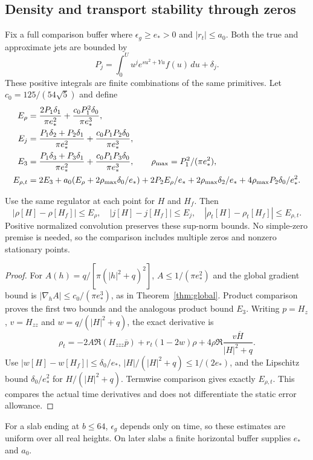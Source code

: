 

\subsection{Density and transport stability through zeros}
Fix a full comparison buffer where $\epsilon_g\ge e_*>0$ and
$|r_t|\le a_0$. Both the true and approximate jets are bounded by
\begin{equation}
 P_j=\int_0^U u^je^{su^2+Yu}f(u)\,du+\delta_j.
 \label{eq:finitejetmajorants}
\end{equation}
These positive integrals are finite combinations of the same primitives.
Let $c_0=125/(54\sqrt5)$ and define
\begin{align}
 E_\rho&=\frac{2P_1\delta_1}{\pi e_*^2}
                   +\frac{c_0P_1^2\delta_0}{\pi e_*^3},\notag\\
 E_j&=\frac{P_1\delta_2+P_2\delta_1}{\pi e_*^2}
                   +\frac{c_0P_1P_2\delta_0}{\pi e_*^3},\notag\\
 E_3&=\frac{P_1\delta_3+P_3\delta_1}{\pi e_*^2}
                   +\frac{c_0P_1P_3\delta_0}{\pi e_*^3},\qquad
 \rho_{\max}=P_1^2/(\pi e_*^2),\label{eq:fieldstability}\\
 E_{\rho,t}&=2E_3+a_0(E_\rho+2\rho_{\max}\delta_0/e_*)
       +2P_2E_\rho/e_*+2\rho_{\max}\delta_2/e_*
       +4\rho_{\max}P_2\delta_0/e_*^2.\notag
\end{align}

\begin{proposition}\label{prop:fieldstability}
Use the same regulator at each point for $H$ and $H_f$. Then
\begin{equation}
 |\rho[H]-\rho[H_f]|\le E_\rho,\quad
 |j[H]-j[H_f]|\le E_j,\quad
 |\rho_t[H]-\rho_t[H_f]|\le E_{\rho,t}.
 \label{eq:stabilityconclusions}
\end{equation}
Positive normalized convolution preserves these sup-norm bounds.
No simple-zero premise is needed, so the comparison includes multiple
zeros and nonzero stationary points.
\end{proposition}
\begin{proof}
For $A(h)=q/[\pi(|h|^2+q)^2]$,
$A\le1/(\pi e_*^2)$ and the global gradient bound is
$|\nabla_h A|\le c_0/(\pi e_*^3)$, as in
Theorem~\ref{thm:global}. Product comparison proves the first two
bounds and the analogous product bound $E_3$.
Writing $p=H_z$, $v=H_{zz}$ and $w=q/(|H|^2+q)$, the exact derivative is
\[
 \rho_t=-2A\Re(H_{zzz}\overline p)+r_t(1-2w)\rho
              +4\rho\Re\frac{v\overline H}{|H|^2+q}.
\]
Use $|w[H]-w[H_f]|\le\delta_0/e_*$,
$|H|/(|H|^2+q)\le1/(2e_*)$, and the Lipschitz bound
$\delta_0/e_*^2$ for $H/(|H|^2+q)$. Termwise comparison gives exactly
$E_{\rho,t}$. This compares the actual time derivatives and does not
differentiate the static error allowance.
\end{proof}
For a slab ending at $b\le64$, $\epsilon_g$ depends only on time,
so these estimates are uniform over all real heights. On later slabs
a finite horizontal buffer supplies $e_*$ and $a_0$.

